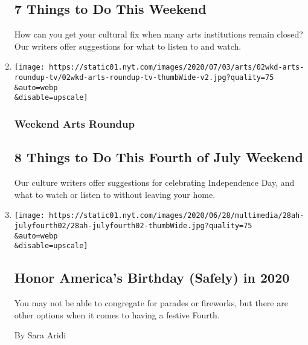 \begin{enumerate}
  \hypertarget{7-things-to-do-this-weekend-1}{%
  \subsection{7 Things to Do This
  Weekend}\label{7-things-to-do-this-weekend-1}}

  How can you get your cultural fix when many arts institutions remain
  closed? Our writers offer suggestions for what to listen to and watch.
\item
  \href{/2020/07/02/arts/things-to-do-weekend-fourth-of-july-coronavirus.html}{}

  \texttt{[image: https://static01.nyt.com/images/2020/07/03/arts/02wkd-arts-roundup-tv/02wkd-arts-roundup-tv-thumbWide-v2.jpg?quality=75\\\&auto=webp\\\&disable=upscale]}

  \hypertarget{weekend-arts-roundup}{%
  \subsubsection{Weekend Arts Roundup}\label{weekend-arts-roundup}}

  \hypertarget{8-things-to-do-this-fourth-of-july-weekend}{%
  \subsection{8 Things to Do This Fourth of July
  Weekend}\label{8-things-to-do-this-fourth-of-july-weekend}}

  Our culture writers offer suggestions for celebrating Independence
  Day, and what to watch or listen to without leaving your home.
\item
  \href{/2020/06/26/at-home/celebrate-fourth-of-july-coronavirus.html}{}

  \texttt{[image: https://static01.nyt.com/images/2020/06/28/multimedia/28ah-julyfourth02/28ah-julyfourth02-thumbWide.jpg?quality=75\\\&auto=webp\\\&disable=upscale]}

  \hypertarget{honor-americas-birthday-safely-in-2020}{%
  \subsection{Honor America's Birthday (Safely) in
  2020}\label{honor-americas-birthday-safely-in-2020}}

  You may not be able to congregate for parades or fireworks, but there
  are other options when it comes to having a festive Fourth.

  By Sara Aridi
\end{enumerate}

